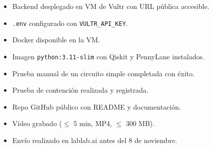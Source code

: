 \documentclass[11pt,a4paper]{article}
\begin{document}
\begin{itemize}
    \item[$\square$] Backend desplegado en VM de Vultr con URL pública accesible.
    \item[$\square$] \texttt{.env} configurado con \texttt{VULTR\_API\_KEY}.
    \item[$\square$] Docker disponible en la VM.
    \item[$\square$] Imagen \texttt{python:3.11-slim} con Qiskit y PennyLane instalados.
    \item[$\square$] Prueba manual de un circuito simple completada con éxito.
    \item[$\square$] Prueba de contención realizada y registrada.
    \item[$\square$] Repo GitHub público con README y documentación.
    \item[$\square$] Vídeo grabado ($\leq$ 5 min, MP4, $\leq$ 300 MB).
    \item[$\square$] Envío realizado en lablab.ai antes del 8 de noviembre.
\end{itemize}
\end{document}
